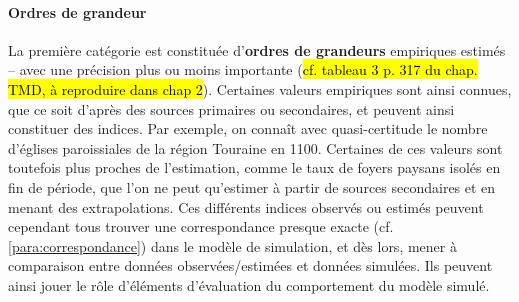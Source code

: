 \paragraph{Ordres de grandeur}
La première catégorie est constituée d'\textbf{ordres de grandeurs} empiriques estimés -- avec une précision plus ou moins importante (\hl{cf. tableau 3 p. 317 du chap. TMD, à reproduire dans chap 2}). Certaines valeurs empiriques sont ainsi connues, que ce soit d'après des sources primaires ou secondaires, et peuvent ainsi constituer des indices. Par exemple, on connaît avec quasi-certitude le nombre d'églises paroissiales de la région Touraine en 1100. Certaines de ces valeurs sont toutefois plus proches de l'estimation, comme le taux de foyers paysans isolés en fin de période, que l'on ne peut qu'estimer à partir de sources secondaires et en menant des extrapolations.
Ces différents indices observés ou estimés peuvent cependant tous trouver une correspondance presque exacte (cf. \cref{para:correspondance}) dans le modèle de simulation, et dès lors, mener à comparaison entre données observées/estimées et données simulées. Ils peuvent ainsi jouer le rôle d'éléments d'évaluation du comportement du modèle simulé.

